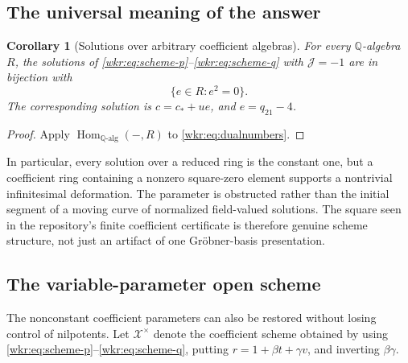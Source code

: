 \documentclass[11pt,a4paper]{article}
\numberwithin{equation}{section}
\newtheorem{corollary}[theorem]{Corollary}
\theoremstyle{definition}
\theoremstyle{remark}
\newcommand{\Q}{\mathbb{Q}}
\newcommand{\J}{\mathcal{J}}
\newcommand{\cstar}{c_*}
\begin{document}
\subsection{The universal meaning of the answer}

\begin{corollary}[Solutions over arbitrary coefficient algebras]
\label{wkr:cor:functor}
For every $\Q$-algebra $R$, the solutions of
\eqref{wkr:eq:scheme-p}--\eqref{wkr:eq:scheme-q} with $\J=-1$ are in bijection with
\[
\{e\in R:e^2=0\}.
\]
The corresponding solution is $c=\cstar+ue$, and $e=q_{21}-4$.
\end{corollary}
\begin{proof}
Apply $\operatorname{Hom}_{\Q\text{-alg}}(-,R)$ to
\eqref{wkr:eq:dualnumbers}.
\end{proof}

In particular, every solution over a reduced ring is the constant one, but
a coefficient ring containing a nonzero square-zero element supports a
nontrivial infinitesimal deformation. The parameter is obstructed rather
than the initial segment of a moving curve of normalized field-valued
solutions. The square seen in the repository's finite coefficient
certificate is therefore genuine scheme structure, not just an artifact
of one Gr\"obner-basis presentation.

\subsection{The variable-parameter open scheme}

The nonconstant coefficient parameters can also be restored without
losing control of nilpotents. Let $\mathcal X^{\times}$ denote the
coefficient scheme obtained by using \eqref{wkr:eq:scheme-p}--\eqref{wkr:eq:scheme-q},
putting $r=1+\beta t+\gamma v$, and inverting $\beta\gamma$.
\end{document}
